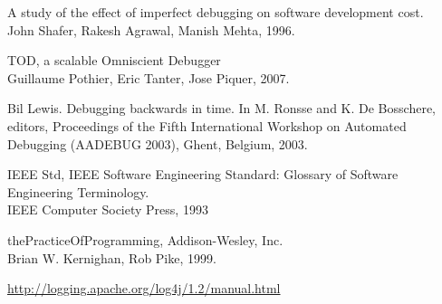 \documentclass[12pt,legalpaper]{report}
\begin{document}
\begin{thebibliography}{30}


 A study of the effect of  imperfect debugging on software development cost.\\
John Shafer, Rakesh Agrawal, Manish Mehta, 1996.


 TOD, a scalable Omniscient Debugger\\
Guillaume Pothier, Eric Tanter, Jose Piquer, 2007.



 Bil Lewis. Debugging backwards in time. In M. Ronsse and K. De Bosschere,
editors, Proceedings of the Fifth International Workshop on Automated Debugging
(AADEBUG 2003), Ghent, Belgium, 2003.


 IEEE Std, IEEE Software Engineering Standard: Glossary of Software Engineering Terminology.\\
IEEE Computer Society Press, 1993


 thePracticeOfProgramming, Addison-Wesley, Inc.\\
Brian W. Kernighan, Rob Pike, 1999. 


\href{http://logging.apache.org/log4j/1.2/manual.html}{http://logging.apache.org/log4j/1.2/manual.html}


\end{thebibliography}
\end{document}

